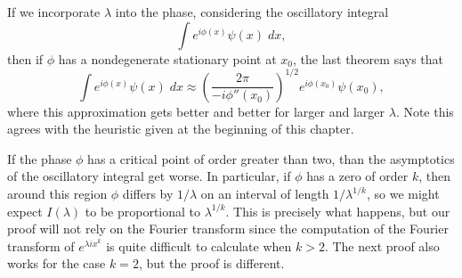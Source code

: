 \begin{remark}
  If we incorporate $\lambda$ into the phase, considering the oscillatory integral
  \[ \int e^{i \phi(x)} \psi(x)\; dx, \]
  then if $\phi$ has a nondegenerate stationary point at $x_0$, the last theorem says that
  \[ \int e^{i \phi(x)} \psi(x)\; dx \approx \left( \frac{2\pi}{-i \phi''(x_0)} \right)^{1/2} e^{i \phi(x_0)} \psi(x_0), \]
  where this approximation gets better and better for larger and larger $\lambda$. Note this agrees with the heuristic given at the beginning of this chapter.
\end{remark}

If the phase $\phi$ has a critical point of order greater than two, than the asymptotics of the oscillatory integral get worse. In particular, if $\phi$ has a zero of order $k$, then around this region $\phi$ differs by $1/\lambda$ on an interval of length $1/\lambda^{1/k}$, so we might expect $I(\lambda)$ to be proportional to $\lambda^{1/k}$. This is precisely what happens, but our proof will not rely on the Fourier transform since the computation of the Fourier transform of $e^{\lambda ix^k}$ is quite difficult to calculate when $k > 2$. The next proof also works for the case $k = 2$, but the proof is different.

